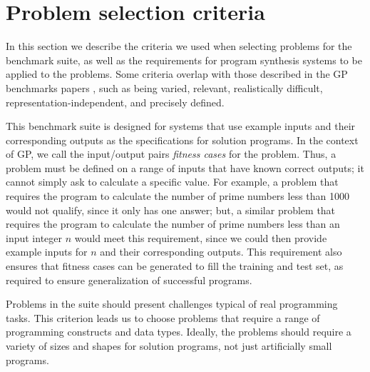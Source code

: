 \documentclass{sig-alternate}
\begin{document}
\section{Problem selection criteria} \label{requirements}

In this section we describe the criteria we used when selecting problems for the benchmark suite, as well as the requirements for program synthesis systems to be applied to the problems. Some criteria overlap with those described in the GP benchmarks papers \cite{McDermott:2012:GECCO, White:2013:BGB:2441218.2441242}, such as being varied, relevant, realistically difficult, representation-independent, and precisely defined. 

This benchmark suite is designed for systems that use example inputs and their corresponding outputs as the specifications for solution programs. In the context of GP, we call the input/output pairs \textit{fitness cases} for the problem. Thus, a problem must be defined on a range of inputs that have known correct outputs; it cannot simply ask to calculate a specific value. For example, a problem that requires the program to calculate the number of prime numbers less than 1000 would not qualify, since it only has one answer; but, a similar problem that requires the program to calculate the number of prime numbers less than an input integer $n$ would meet this requirement, since we could then provide example inputs for $n$ and their corresponding outputs. This requirement also ensures that fitness cases can be generated to fill the training and test set, as required to ensure generalization of successful programs.

Problems in the suite should present challenges typical of real programming tasks. 
This criterion leads us to choose problems that require a range of programming constructs and data types. Ideally, the problems should require a variety of sizes and shapes for solution programs, not just artificially small programs. 
\end{document}
